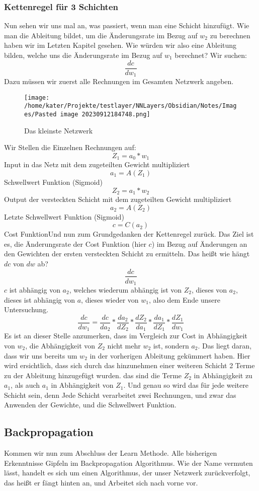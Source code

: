 \documentclass[12pt]{article}
\begin{document}
\subsubsection{ Kettenregel für 3 Schichten}Nun sehen wir uns mal an, was passiert, wenn man eine Schicht hinzufügt. Wie man die Ableitung bildet, um die Änderungsrate im Bezug auf $w_2$ zu berechnen haben wir im Letzten Kapitel gesehen. Wie würden wir also eine Ableitung bilden, welche uns die Änderungsrate im Bezug auf $w_1$ berechnet?
Wir suchen:$$\frac{ dc }{ dw_{ 1 } }$$
Dazu müssen wir zuerst alle Rechnungen im Gesamten Netzwerk angeben.
\begin{figure}[H]
\centering
\texttt{[image: /home/kater/Projekte/testlayer/NNLayers/Obsidian/Notes/Images/Pasted image 20230912184748.png]}
\caption{Das kleinste Netzwerk}
\label{Was kommt hier rein?}
\end{figure}
Wir Stellen die Einzelnen Rechnungen auf:
$$Z_1 = a_0*w_1$$
Input in das Netz mit dem zugeteilten Gewicht multipliziert
$$a_1=A(Z_1)$$
Schwellwert Funktion (Sigmoid)
$$Z_2=a_1*w_2$$
Output der versteckten Schicht mit dem zugeteilten Gewicht  multipliziert
$$a_2=A(Z_2)$$
Letzte Schwellwert Funktion (Sigmoid)
$$c=C(a_2)$$
Cost FunktionUnd nun zum Grundgedanken der Kettenregel zurück. Das Ziel ist es, die Änderungsrate der Cost Funktion (hier $c$) im Bezug auf Änderungen an den Gewichten der ersten versteckten Schicht zu ermitteln. Das heißt wie hängt $dc$ von $dw$ ab?
$$\frac{dc}{dw_1}$$
$c$ ist abhängig von $a_2$, welches wiederum abhängig ist von $Z_2$, dieses von $a_2$, dieses ist abhängig von $a$, dieses wieder von $w_1$, also dem Ende unsere Untersuchung.
$$\frac{ dc }{ dw_{ 1 } }=
\frac{ dc }{ da_{ 2 } }*
\frac{ da_{ 2 } }{ dZ_{ 2 } }*
\frac{ dZ_{ 2 } }{ da_{ 1 } }*
\frac{ da_{ 1 } }{ dZ_{ 1 } }*
\frac{ dZ_{ 1 } }{ dw_{ 1 } }$$
Es ist an dieser Stelle anzumerken, dass im Vergleich zur Cost in Abhängigkeit von $w_2$, die Abhängigkeit von $Z_2$ nicht mehr $w_2$ ist, sondern $a_2$. Das liegt daran, dass wir uns bereits um $w_2$ in der vorherigen Ableitung gekümmert haben.
Hier wird ersichtlich, dass sich durch das hinzunehmen einer weiteren Schicht 2 Terme zu der Ableitung hinzugefügt wurden. das sind die Terme $Z_2$ in Abhängigkeit zu $a_1$, als auch $a_1$ in Abhängigkeit von $Z_1$. 
Und genau so wird das für jede weitere Schicht sein, denn Jede Schicht verarbeitet zwei Rechnungen, und zwar das Anwenden der Gewichte, und die Schwellwert Funktion.\subsection{ Backpropagation}Kommen wir nun zum Abschluss der Learn Methode. Alle bisherigen Erkenntnisse Gipfeln im Backpropagation Algorithmus. Wie der Name vermuten lässt, handelt es sich um einen Algorithmus, der unser Netzwerk zurückverfolgt, das heißt er fängt hinten an, und Arbeitet sich nach vorne vor. 
\end{document}
